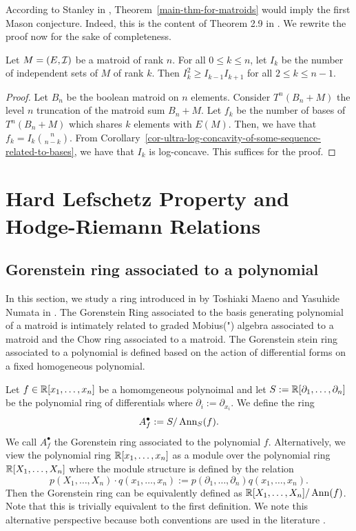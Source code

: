 \documentclass{puthesis-UG}
\begin{document}
According to Stanley in \cite{STANLEY}, Theorem~\ref{main-thm-for-matroids} would imply the first Mason conjecture. Indeed, this is the content of Theorem 2.9 in \cite{STANLEY}. We rewrite the proof now for the sake of completeness. 

\begin{thm}
	Let $M = (E, \mathcal{I})$ be a matroid of rank $n$. For all $0 \leq k \leq n$, let $I_k$ be the number of independent sets of $M$ of rank $k$. Then $I_k^2 \geq I_{k-1} I_{k+1}$ for all $2 \leq k \leq n-1$. 
\end{thm}

\begin{proof}
	Let $B_n$ be the boolean matroid on $n$ elements. Consider $T^n (B_n + M)$ the level $n$ truncation of the matroid sum $B_n + M$. Let $f_k$ be the number of bases of $T^n(B_n + M)$ which shares $k$ elements with $E(M)$. Then, we have that $f_k = I_k \binom{n}{n-k}$. From Corollary~\ref{cor-ultra-log-concavity-of-some-sequence-related-to-bases}, we have that $I_k$ is log-concave. This suffices for the proof. 
\end{proof}

\chapter{Hard Lefschetz Property and Hodge-Riemann Relations}

\section{Gorenstein ring associated to a polynomial}

In this section, we study a ring introduced in by Toshiaki Maeno and Yasuhide Numata in \cite{MN-gorenstein}. The Gorenstein Ring associated to the basis generating polynomial of a matroid is intimately related to graded Mobius(") algebra associated to a matroid and the Chow ring associated to a matroid. The Gorenstein stein ring associated to a polynomial is defined based on the action of differential forms on a fixed homogeneous polynomial.

\begin{defn}
	Let $f \in \mathbb{R}[x_1, \ldots, x_n]$ be a homomgeneous polynoimal and let $S := \mathbb{R}[\partial_1, \ldots, \partial_n]$ be the polynomial ring of differentials where $\partial_i := \partial_{x_i}$. We define the ring 
	\[
		A_f^\bullet := S / \operatorname{Ann}_S (f).
	\]
	We call $A_f^\bullet$ the Gorenstein ring associated to the polynomial $f$. Alternatively, we view the polynomial ring $\mathbb{R}[x_1, \ldots, x_n]$ as a module over the polynomial ring $\mathbb{R}[X_1, \ldots, X_n]$ where the module structure is defined by the relation
	\[
		p(X_1, \ldots, X_n) \cdot q(x_1, \ldots, x_n) := p(\partial_1, \ldots, \partial_n) q(x_1, \ldots, x_n). 
	\]
	Then the Gorenstein ring can be equivalently defined as $\mathbb{R}[X_1, \ldots, X_n] / \operatorname{Ann} (f)$. Note that this is trivially equivalent to the first definition. We note this alternative perspective because both conventions are used in the literature \cite{MNY,MN-gorenstein}. 
\end{defn}
\end{document}
